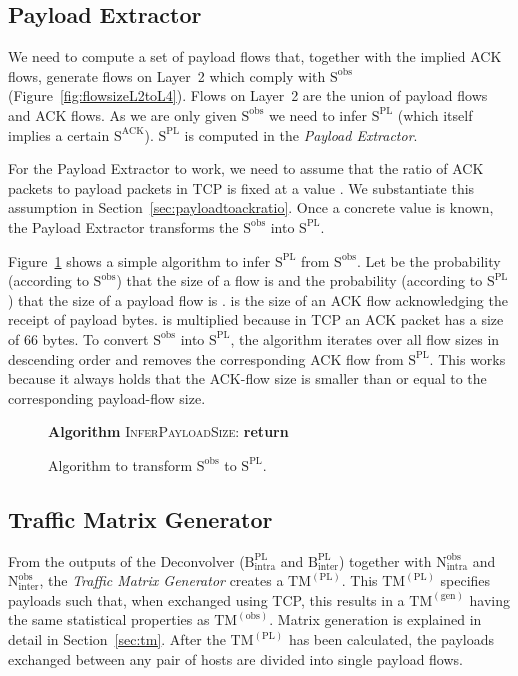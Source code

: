 \documentclass[journal,10pt]{IEEEtran}
\newcommand{\lt}{Layer~2}
\newcommand{\obstm}{\ensuremath{\mathrm{TM}^{(\mathrm{obs})}}}
\newcommand{\gentm}{\ensuremath{\mathrm{TM}^{(\mathrm{gen})}}}
\newcommand{\pltm}{\ensuremath{\mathrm{TM}^{(\mathrm{PL})}}}
\newcommand{\bytes}[2]{\ensuremath{\mathrm{B}^{\mathrm{#1}}_{\mathrm{#2}}}}
\newcommand{\partners}[2]{\ensuremath{\mathrm{N}^{\mathrm{#1}}_{\mathrm{#2}}}}
\newcommand{\size}[1]{\ensuremath{\mathrm{S}  ^{\mathrm{#1}}}}
\begin{document}
\subsection{Payload Extractor}
We need to compute a set of payload flows that, together with the implied ACK flows, generate flows on \lt{} which comply with \size{obs}
(Figure~\ref{fig:flowsizeL2toL4}). 
Flows on \lt{} are the union of payload flows and ACK flows.
As we are only given \size{obs} we need to infer \size{PL}
(which itself implies a certain \size{ACK}).
\size{PL} is computed in the \emph{Payload Extractor}.

For the Payload Extractor to work, we need to
assume that the ratio of ACK packets to payload packets in TCP is fixed at a value . 
We substantiate this assumption in Section~\ref{sec:payloadtoackratio}.
Once a concrete value  is known, the Payload Extractor transforms the \size{obs} into \size{PL}.

Figure~\ref{algo:flowsizetoPL} shows a simple algorithm to infer \size{PL} from \size{obs}.
Let  be the probability (according to \size{obs}) that the size of a flow is 
and  the probability (according to \size{PL}) that the size of a payload flow is .
 is the size of an ACK flow acknowledging
the receipt of  payload bytes.  is multiplied because in TCP an ACK packet has a size of 66 bytes.
To convert \size{obs} into \size{PL},
the algorithm iterates over all flow sizes in descending order
and removes the corresponding ACK flow from \size{PL}.
This works because it always holds that the ACK-flow size is smaller than or equal to the corresponding payload-flow size.

\begin{figure}
\begin{algorithmic}[1]
	\State \textbf{Algorithm} \textsc{InferPayloadSize}:
	\State 
		\State 
	\EndFor
	\State  {}
	\State \textbf{return} 
\end{algorithmic}
	\caption{Algorithm to transform \size{obs} to \size{PL}.}
	\label{algo:flowsizetoPL}
\end{figure}




\subsection{Traffic Matrix Generator}
From the outputs of the Deconvolver (\bytes{PL}{intra} and \bytes{PL}{inter}) together with \partners{obs}{intra} and \partners{obs}{inter},
the \emph{Traffic Matrix Generator} creates a \pltm{}.
This \pltm{} specifies payloads such that, when exchanged using TCP, this results in a \gentm{}
having the same statistical properties as \obstm{}.
Matrix generation is explained in detail in Section~\ref{sec:tm}.
After the \pltm{} has been calculated, the payloads exchanged between any pair of hosts are divided into single payload flows.
\end{document}
